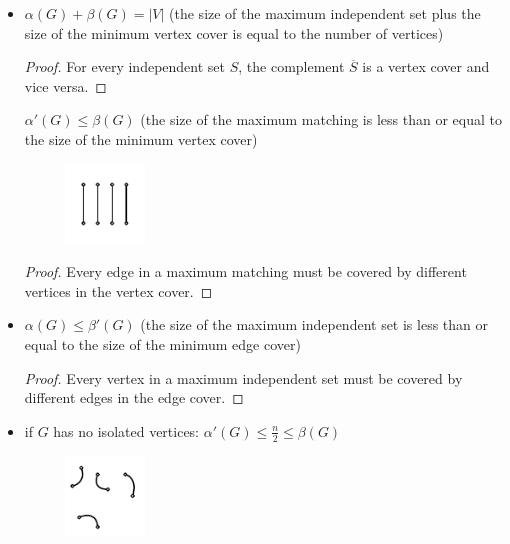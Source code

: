 \documentclass[notitlepage, 12pt]{article}
\begin{document}
\begin{itemize}
  \item $\alpha(G) + \beta(G) = |V|$ (the size of the maximum independent set plus the size of the minimum vertex cover is equal to the number of vertices)
  \begin{proof}
    For every independent set $S$, the complement $\overline{S}$ is a vertex cover and vice versa.
  \end{proof}
  $\alpha'(G) \leq \beta(G)$ (the size of the maximum matching is less than or equal to the size of the minimum vertex cover)
  \begin{figure}[h]
    \includegraphics[width=0.2\textwidth]{matching-number-smaller-than-vertex-cover.pdf}
    \centering
  \end{figure}
  \begin{proof}
    Every edge in a maximum matching must be covered by different vertices in the vertex cover.
  \end{proof}
  \item \MakeLinkTarget{}\label{alpha-leq-betaline} $\alpha(G) \leq \beta'(G)$ (the size of the maximum independent set is less than or equal to the size of the minimum edge cover)
  \begin{proof}
    Every vertex in a maximum independent set must be covered by different edges in the edge cover.
  \end{proof}
  \item if $G$ has no isolated vertices: $\alpha'(G) \leq \frac{n}{2} \leq \beta(G)$
  \begin{figure}[h]
    \includegraphics[width=0.2\textwidth]{matching-number-smaller-than-vertex-cover-2.pdf}
    \centering
  \end{figure}
\end{itemize}
\newpage
\end{document}
